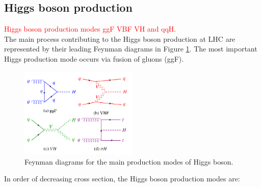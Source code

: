 \subsection{Higgs boson production}
\label{chap1:EWSB:HP}
\textcolor{red}{Higgs boson production modes ggF VBF VH and qqH. \\}
The main process contributing to the Higgs boson production at LHC are represented by their leading Feynman diagrams in Figure \ref{fig:chap1:EWSB:HP}. The most important Higgs production mode occurs via fusion of gluons (ggF). 
\begin{figure}[H]
    \centering
    \includegraphics[width=0.5\textwidth]{Ch1/Img/Higgs_prod_modes.png}
    \caption{Feynman diagrams for the main production modes of Higgs boson.}
    \label{fig:chap1:EWSB:HP}
\end{figure}
In order of decreasing cross section, the Higgs boson production modes are:
